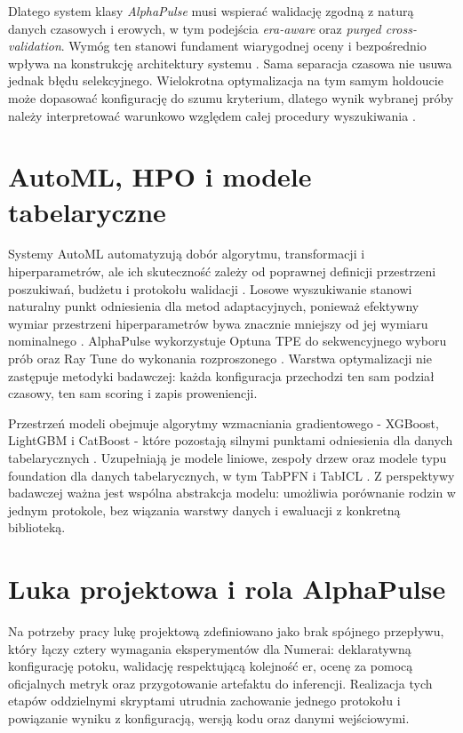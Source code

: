 \documentclass[12pt,a4paper]{report}
\newcommand{\sourcecite}[1]{\autocite{#1}}
\begin{document}
Dlatego system klasy \textit{AlphaPulse} musi wspierać walidację zgodną z naturą danych
czasowych i erowych, w tym podejścia \textit{era-aware} oraz \textit{purged cross-validation}.
Wymóg ten stanowi fundament wiarygodnej oceny i bezpośrednio wpływa na konstrukcję
architektury systemu \sourcecite{lopez,bergmeir-cv}. Sama separacja czasowa nie usuwa
jednak błędu selekcyjnego. Wielokrotna optymalizacja na tym samym holdoucie może
dopasować konfigurację do szumu kryterium, dlatego wynik wybranej próby należy
interpretować warunkowo względem całej procedury wyszukiwania
\sourcecite{cawley-talbot,bailey-backtest}.

\section{AutoML, HPO i modele tabelaryczne}
Systemy AutoML automatyzują dobór algorytmu, transformacji i hiperparametrów, ale ich
skuteczność zależy od poprawnej definicji przestrzeni poszukiwań, budżetu i protokołu
walidacji \sourcecite{automl-survey,autosklearn,autoweka}. Losowe wyszukiwanie stanowi
naturalny punkt odniesienia dla metod adaptacyjnych, ponieważ efektywny wymiar
przestrzeni hiperparametrów bywa znacznie mniejszy od jej wymiaru nominalnego
\sourcecite{bergstra-random}. AlphaPulse wykorzystuje Optuna TPE do sekwencyjnego wyboru
prób oraz Ray Tune do wykonania rozproszonego \sourcecite{optuna,ray}. Warstwa optymalizacji
nie zastępuje metodyki badawczej: każda konfiguracja przechodzi ten sam podział
czasowy, ten sam scoring i zapis proweniencji.

Przestrzeń modeli obejmuje algorytmy wzmacniania gradientowego - XGBoost, LightGBM i
CatBoost - które pozostają silnymi punktami odniesienia dla danych tabelarycznych
\sourcecite{xgboost,lightgbm,catboost,grinsztajn}. Uzupełniają je modele liniowe, zespoły
drzew oraz modele typu foundation dla danych tabelarycznych, w tym TabPFN i TabICL
\sourcecite{tabpfn,tabicl}. Z perspektywy badawczej
ważna jest wspólna abstrakcja modelu: umożliwia porównanie rodzin w jednym protokole,
bez wiązania warstwy danych i ewaluacji z konkretną biblioteką.

\section{Luka projektowa i rola AlphaPulse}
Na potrzeby pracy lukę projektową zdefiniowano jako brak spójnego przepływu, który
łączy cztery wymagania eksperymentów dla Numerai: deklaratywną konfigurację potoku,
walidację respektującą kolejność er, ocenę za pomocą oficjalnych metryk oraz
przygotowanie artefaktu do inferencji. Realizacja tych etapów oddzielnymi skryptami
utrudnia zachowanie jednego protokołu i powiązanie wyniku z konfiguracją, wersją
kodu oraz danymi wejściowymi.
\end{document}
